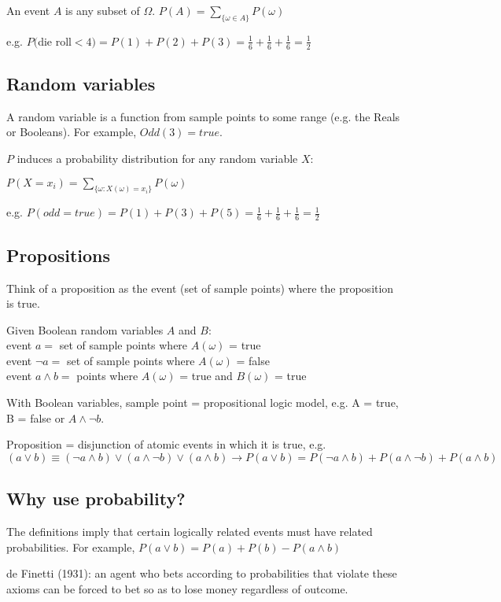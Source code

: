 An event $A$ is any subset of $\Omega$. $P(A) = \sum_{\{\omega \in A\}}
P(\omega)$

e.g. $P($die roll$ < 4) = P(1) + P(2) + P(3) = \frac{1}{6} + \frac{1}{6} +
\frac{1}{6} = \frac{1}{2}$

\subsection{Random variables}
A random variable is a function from sample points to some range (e.g.
the Reals or Booleans). For example, $Odd(3) = true$.

$P$ induces a probability distribution for any random variable $X$:

{\centering
    $P(X = x_i) = \sum_{\{\omega : X(\omega) = x_i\}} P(\omega)$

}

e.g. $P(odd = true) = P(1) + P(3) + P(5) = \frac{1}{6} + \frac{1}{6} +
\frac{1}{6} = \frac{1}{2}$

\subsection{Propositions}
Think of a proposition as the event (set of sample points) where the
proposition is true.

Given Boolean random variables $A$ and $B$:\\
event $a = $ set of sample points where $A(\omega)$ = true\\
event $\neg a = $ set of sample points where $A(\omega)$ = false\\
event $a \land b = $ points where $A(\omega)$ = true and $B(\omega)$ = true

With Boolean variables, sample point = propositional logic model, e.g. A =
true, B = false or $A \land \neg b$.

Proposition = disjunction of atomic events in which it is true, e.g. $(a \lor
b) \equiv (\neg a \land b) \lor (a \land \neg b) \lor (a \land b) \rightarrow
P(a \lor b) = P(\neg a \land b) + P(a \land \neg b) + P(a \land b)$

\subsection{Why use probability?}
The definitions imply that certain logically related events must have related
probabilities. For example, $P(a \lor b) = P(a) + P(b) - P(a \land b)$

de Finetti (1931): an agent who bets according to probabilities that violate
these axioms can be forced to bet so as to lose money regardless of outcome.

